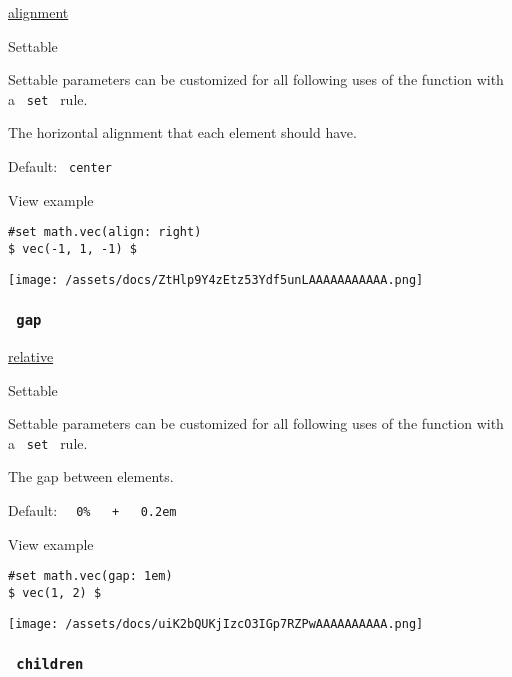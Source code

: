 \href{/docs/reference/layout/alignment/}{alignment}

{{ Settable }}

\label{parameters-align-settable-tooltip}
Settable parameters can be customized for all following uses of the
function with a \texttt{\ set\ } rule.

The horizontal alignment that each element should have.

Default: \texttt{\ center\ }


View example

\begin{verbatim}
#set math.vec(align: right)
$ vec(-1, 1, -1) $
\end{verbatim}

\texttt{[image: /assets/docs/ZtHlp9Y4zEtz53Ydf5unLAAAAAAAAAAA.png]}

\subsubsection{\texorpdfstring{\texttt{\ gap\ }}{ gap }}\label{parameters-gap}

\href{/docs/reference/layout/relative/}{relative}

{{ Settable }}

\label{parameters-gap-settable-tooltip}
Settable parameters can be customized for all following uses of the
function with a \texttt{\ set\ } rule.

The gap between elements.

Default:
\texttt{\ }{\texttt{\ 0\%\ }}\texttt{\ }{\texttt{\ +\ }}\texttt{\ }{\texttt{\ 0.2em\ }}\texttt{\ }


View example

\begin{verbatim}
#set math.vec(gap: 1em)
$ vec(1, 2) $
\end{verbatim}

\texttt{[image: /assets/docs/uiK2bQUKjIzcO3IGp7RZPwAAAAAAAAAA.png]}

\subsubsection{\texorpdfstring{\texttt{\ children\ }}{ children }}\label{parameters-children}

